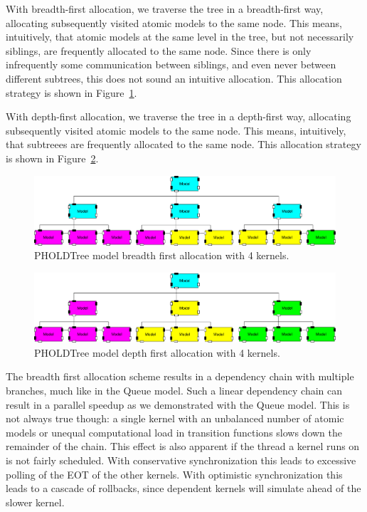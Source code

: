 With breadth-first allocation, we traverse the tree in a breadth-first way, allocating subsequently visited atomic models to the same node.
This means, intuitively, that atomic models at the same level in the tree, but not necessarily siblings, are frequently allocated to the same node.
Since there is only infrequently some communication between siblings, and even never between different subtrees, this does not sound an intuitive allocation.
This allocation strategy is shown in Figure~\ref{fig:PholdTree_model_bfs}.

With depth-first allocation, we traverse the tree in a depth-first way, allocating subsequently visited atomic models to the same node.
This means, intuitively, that subtreees are frequently allocated to the same node.
This allocation strategy is shown in Figure~\ref{fig:PholdTree_model_dfs}.

\begin{figure}
   \center
   \includegraphics[width=\columnwidth]{fig/pholdtree_alloc_BF.pdf}
   \caption{PHOLDTree model breadth first allocation with 4 kernels.}
   \label{fig:PholdTree_model_bfs}
\end{figure}
\begin{figure}
   \center
   \includegraphics[width=\columnwidth]{fig/pholdtree_alloc_DF.pdf}
   \caption{PHOLDTree model depth first allocation with 4 kernels.}
   \label{fig:PholdTree_model_dfs}
\end{figure}

The breadth first allocation scheme results in a dependency chain with multiple branches, much like in the Queue model.
Such a linear dependency chain can result in a parallel speedup as we demonstrated with the Queue model.
This is not always true though: a single kernel with an unbalanced number of atomic models or unequal computational load in transition functions slows down the remainder of the chain.
This effect is also apparent if the thread a kernel runs on is not fairly scheduled.
With conservative synchronization this leads to excessive polling of the EOT of the other kernels.
With optimistic synchronization this leads to a cascade of rollbacks, since dependent kernels will simulate ahead of the slower kernel.

